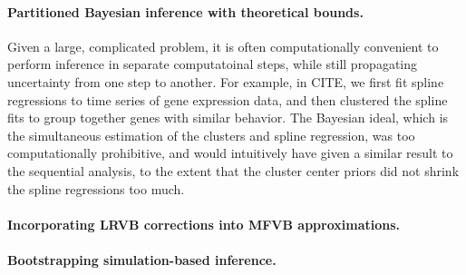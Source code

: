 \paragraph{Partitioned Bayesian inference with theoretical bounds.}

Given a large, complicated problem, it is often computationally convenient to
perform inference in separate computatoinal steps, while still propagating
uncertainty from one step to another.  For example, in CITE, we first fit spline
regressions to time series of gene expression data, and then clustered the
spline fits to group together genes with similar behavior.  The Bayesian ideal,
which is the simultaneous estimation of the clusters and spline regression, was
too computationally prohibitive, and would intuitively have given a similar
result to the sequential analysis, to the extent that the cluster center priors
did not shrink the spline regressions too much.


\paragraph{Incorporating LRVB corrections into MFVB approximations.}



\paragraph{Bootstrapping simulation-based inference.}








